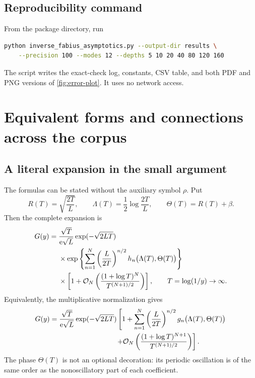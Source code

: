 \documentclass[11pt,oneside]{article}
\numberwithin{equation}{section}
\theoremstyle{definition}
\theoremstyle{remark}
\newcommand{\e}{\mathrm e}
\newcommand{\cO}{\mathcal O}
\begin{document}
\subsection{Reproducibility command}
From the package directory, run
\begin{lstlisting}[style=reportcode,language=bash]
python inverse_fabius_asymptotics.py --output-dir results \
    --precision 100 --modes 12 --depths 5 10 20 40 80 120 160
\end{lstlisting}
The script writes the exact-check log, constants, CSV table, and both PDF and PNG versions of \cref{fig:error-plot}.  It uses no network access.

\section{Equivalent forms and connections across the corpus}
\label{sec:connections}

\subsection{A literal expansion in the small argument}
The formulas can be stated without the auxiliary symbol $\rho$.  Put
\begin{equation}
 R(T)=\sqrt{\frac{2T}{L}},
 \qquad
 \Lambda(T)=\frac12\log\frac{2T}{L},
 \qquad
 \Theta(T)=R(T)+\beta.
 \label{eq:T-dictionary}
\end{equation}
Then the complete expansion is
\begin{align}
 G(y)={}&\frac{\sqrt T}{\e\sqrt L}
 \exp(-\sqrt{2LT})
 \notag\\
 &\times\exp\left\{
 \sum_{n=1}^{N}
 \left(\frac{L}{2T}\right)^{n/2}
 h_n\bigl(\Lambda(T),\Theta(T)\bigr)
 \right\}
 \notag\\
 &\times\left[1+
 \cO_N\left(
 \frac{(1+\log T)^N}{T^{(N+1)/2}}
 \right)\right],
 \qquad T=\log(1/y)\to\infty.
 \label{eq:literal-y-expansion}
\end{align}
Equivalently, the multiplicative normalization gives
\begin{align}
 G(y)={}&\frac{\sqrt T}{\e\sqrt L}\exp(-\sqrt{2LT})
 \left[1+\sum_{n=1}^{N}
 \left(\frac{L}{2T}\right)^{n/2}
 g_n\bigl(\Lambda(T),\Theta(T)\bigr)\right.
 \notag\\
 &\left.\hspace{8em}+
 \cO_N\left(\frac{(1+\log T)^{N+1}}{T^{(N+1)/2}}\right)\right].
 \label{eq:literal-g-expansion}
\end{align}
The phase $\Theta(T)$ is not an optional decoration: its periodic oscillation is of the same order as the nonoscillatory part of each coefficient.
\end{document}
